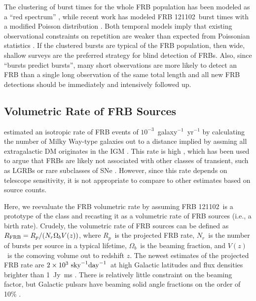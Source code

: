 \documentclass[twocolumn]{aastex61}
\newcommand{\frb}{FRB 121102}
\begin{document}
The clustering of burst times for the whole FRB population has been modeled as a ``red spectrum'' \citep{2016MNRAS.458L..89C}, while recent work has modeled \frb\ burst times with a modified Poisson distribution \citep{oppermann}. Both temporal models imply that existing observational constraints on repetition are weaker than expected from Poissonian statistics \citep{2015MNRAS.454..457P, 2015ApJ...807...16L}. If the clustered bursts are typical of the FRB population, then wide, shallow surveys are the preferred strategy for blind detection of FRBs. Also, since ``bursts predict bursts'', many short observations are more likely to detect an FRB than a single long observation of the same total length and all new FRB detections should be immediately and intensively followed up.

\subsection{Volumetric Rate of FRB Sources}

\citet{2013Sci...341...53T} estimated an isotropic rate of FRB events of $10^{-3}$\ galaxy$^{-1}$\ yr$^{-1}$ by calculating the number of Milky Way-type galaxies out to a distance implied by assming all extragalactic DM originates in the IGM \citep[$z\approx0.9$\ for DM$\approx z\times900\ \rm{pc}\ \rm{cm}^{-3}$;][]{2003ApJ...598L..79I,2004MNRAS.348..999I}. This rate is high \citep[comparable to the rate of core-collapse supernovae;][]{2006Natur.439...45D}, which has been used to argue that FRBs are likely not associated with other classes of transient, such as LGRBs or rare subclasses of SNe \citep{2006ARA&A..44..507W}. However, since this rate depends on telescope sensitivity, it is not appropriate to compare to other estimates based on source counts.

Here, we reevaluate the FRB volumetric rate by assuming \frb\ is a prototype of the class and recasting it as a volumetric rate of FRB sources (i.e., a birth rate). Crudely, the volumetric rate of FRB sources can be defined as $R_{\rm{FRB}} = R_p /(N_r \Omega_b V (z))$, where $R_p$\ is the projected FRB rate, $N_r$\ is the number of bursts per source in a typical lifetime, $\Omega_b$\ is the beaming fraction, and $V(z)$\ is the comoving volume out to redshift $z$. The newest estimates of the projected FRB rate are $2\times10^3\ \rm{sky}^{-1} \rm{day}^{-1}$\ at high Galactic latitudes and flux densities brighter than 1~Jy~ms \citep{2016arXiv161100458L, 2016MNRAS.460L..30C, 2016MNRAS.455.2207R}. There is relatively little constraint on the beaming factor, but Galactic pulsars have beaming solid angle fractions on the order of 10\% \citep{1998MNRAS.298..625T}.
\end{document}
